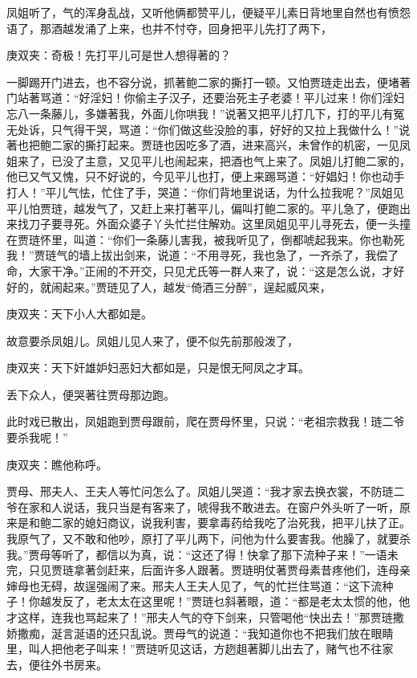 \begin{parag}
    凤姐听了，气的浑身乱战，又听他俩都赞平儿，便疑平儿素日背地里自然也有愤怨语了，那酒越发涌了上来，也并不忖夺，回身把平儿先打了两下，\begin{note}庚双夹：奇极！先打平儿可是世人想得著的？\end{note}一脚踢开门进去，也不容分说，抓著鲍二家的撕打一顿。又怕贾琏走出去，便堵著门站著骂道：“好淫妇！你偷主子汉子，还要治死主子老婆！平儿过来！你们淫妇忘八一条藤儿，多嫌著我，外面儿你哄我！”说著又把平儿打几下，打的平儿有冤无处诉，只气得干哭，骂道：“你们做这些没脸的事，好好的又拉上我做什么！”说著也把鲍二家的撕打起来。贾琏也因吃多了酒，进来高兴，未曾作的机密，一见凤姐来了，已没了主意，又见平儿也闹起来，把酒也气上来了。凤姐儿打鲍二家的，他已又气又愧，只不好说的，今见平儿也打，便上来踢骂道：“好娼妇！你也动手打人！”平儿气怯，忙住了手，哭道：“你们背地里说话，为什么拉我呢？”凤姐见平儿怕贾琏，越发气了，又赶上来打著平儿，偏叫打鲍二家的。平儿急了，便跑出来找刀子要寻死。外面众婆子丫头忙拦住解劝。这里凤姐见平儿寻死去，便一头撞在贾琏怀里，叫道：“你们一条藤儿害我，被我听见了，倒都唬起我来。你也勒死我！”贾琏气的墙上拔出剑来，说道：“不用寻死，我也急了，一齐杀了，我偿了命，大家干净。”正闹的不开交，只见尤氏等一群人来了，说：“这是怎么说，才好好的，就闹起来。”贾琏见了人，越发“倚酒三分醉”，逞起威风来，\begin{note}庚双夹：天下小人大都如是。\end{note}故意要杀凤姐儿。凤姐儿见人来了，便不似先前那般泼了，\begin{note}庚双夹：天下奸雄妒妇恶妇大都如是，只是恨无阿凤之才耳。\end{note}丢下众人，便哭著往贾母那边跑。
\end{parag}


\begin{parag}
    此时戏已散出，凤姐跑到贾母跟前，爬在贾母怀里，只说：“老祖宗救我！琏二爷要杀我呢！”\begin{note}庚双夹：瞧他称呼。\end{note}贾母、邢夫人、王夫人等忙问怎么了。凤姐儿哭道：“我才家去换衣裳，不防琏二爷在家和人说话，我只当是有客来了，唬得我不敢进去。在窗户外头听了一听，原来是和鲍二家的媳妇商议，说我利害，要拿毒药给我吃了治死我，把平儿扶了正。我原气了，又不敢和他吵，原打了平儿两下，问他为什么要害我。他臊了，就要杀我。”贾母等听了，都信以为真，说：“这还了得！快拿了那下流种子来！”一语未完，只见贾琏拿著剑赶来，后面许多人跟著。贾琏明仗著贾母素昔疼他们，连母亲婶母也无碍，故逞强闹了来。邢夫人王夫人见了，气的忙拦住骂道：“这下流种子！你越发反了，老太太在这里呢！”贾琏乜斜著眼，道：“都是老太太惯的他，他才这样，连我也骂起来了！”邢夫人气的夺下剑来，只管喝他“快出去！”那贾琏撒娇撒痴，涎言涎语的还只乱说。贾母气的说道：“我知道你也不把我们放在眼睛里，叫人把他老子叫来！”贾琏听见这话，方趔趄著脚儿出去了，赌气也不往家去，便往外书房来。
\end{parag}


